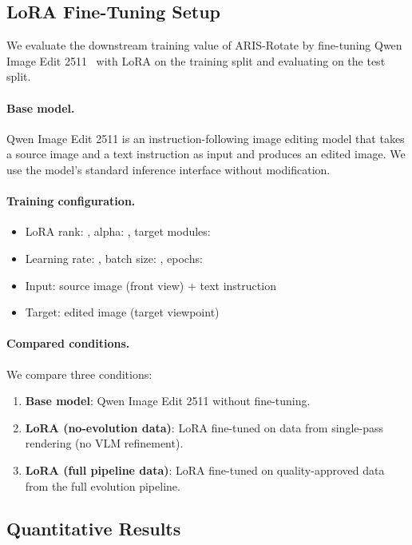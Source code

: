 \subsection{LoRA Fine-Tuning Setup}
\label{sec:exp:lora_setup}

We evaluate the downstream training value of ARIS-Rotate by fine-tuning
Qwen Image Edit 2511~\cite{PLACEHOLDER_qwen_image_edit_verify} with LoRA
on the training split and evaluating on the test split.

\paragraph{Base model.}
Qwen Image Edit 2511 is an instruction-following image editing model
that takes a source image and a text instruction as input and produces an edited image.
We use the model's standard inference interface without modification.

\paragraph{Training configuration.}
\begin{itemize}
  \item LoRA rank: , alpha: , target modules: 
  \item Learning rate: , batch size: , epochs: 
  \item Input: source image (front view) + text instruction
  \item Target: edited image (target viewpoint)
\end{itemize}

\paragraph{Compared conditions.}
We compare three conditions:
\begin{enumerate}
  \item \textbf{Base model}: Qwen Image Edit 2511 without fine-tuning.
  \item \textbf{LoRA (no-evolution data)}: LoRA fine-tuned on data from
    single-pass rendering (no VLM refinement).
  \item \textbf{LoRA (full pipeline data)}: LoRA fine-tuned on quality-approved data
    from the full \aris{} evolution pipeline.
\end{enumerate}


\subsection{Quantitative Results}
\label{sec:exp:quant}

